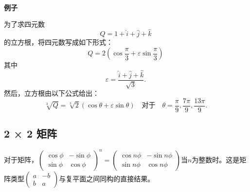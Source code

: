 \textbf{例子}  

为了求四元数
\[
Q = 1 + \hat{i} + \hat{j} + \hat{k}~
\]
的立方根，将四元数写成如下形式：
\[
Q = 2 \left( \cos \frac{\pi}{3} + \varepsilon \sin \frac{\pi}{3} \right)~
\]
其中
\[
\varepsilon = \frac{\hat{i} + \hat{j} + \hat{k}}{\sqrt{3}}.~
\]
然后，立方根由以下公式给出：
\[
\sqrt[3]{Q} = \sqrt[3]{2} \left( \cos \theta + \varepsilon \sin \theta \right) \quad \text{对于} \quad \theta = \frac{\pi}{9}, \frac{7\pi}{9}, \frac{13\pi}{9}.~
\]
\subsection{2 × 2 矩阵}  
对于矩阵，\(\begin{pmatrix} \cos \phi & -\sin \phi \\ \sin \phi & \cos \phi \end{pmatrix}^n = \begin{pmatrix} \cos n\phi & -\sin n\phi \\ \sin n\phi & \cos n\phi \end{pmatrix}\)当\( n \)为整数时。这是矩阵类型\(\begin{pmatrix} a & -b \\ b & a \end{pmatrix}\)与复平面之间同构的直接结果。
